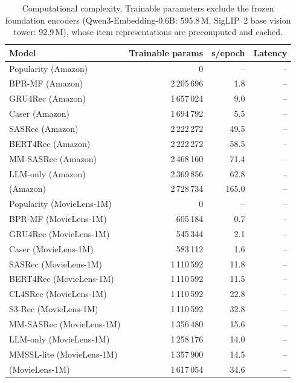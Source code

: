 \begin{table}[t]
\centering
\caption{Computational complexity. Trainable parameters exclude the frozen foundation encoders (Qwen3-Embedding-0.6B: 595.8\,M, SigLIP~2 base vision tower: 92.9\,M), whose item representations are precomputed and cached.}
\label{tab:complexity}
\small
\begin{tabular}{lrrr}
\toprule
Model & Trainable params & s/epoch & Latency \\
\midrule
Popularity (Amazon) & 0 & -- & -- \\
BPR-MF (Amazon) & 2\,205\,696 & 1.8 & -- \\
GRU4Rec (Amazon) & 1\,657\,024 & 9.0 & -- \\
Caser (Amazon) & 1\,694\,792 & 5.5 & -- \\
SASRec (Amazon) & 2\,222\,272 & 49.5 & -- \\
BERT4Rec (Amazon) & 2\,222\,272 & 58.5 & -- \\
MM-SASRec (Amazon) & 2\,468\,160 & 71.4 & -- \\
LLM-only (Amazon) & 2\,369\,856 & 62.8 & -- \\
\model{} (Amazon) & 2\,728\,734 & 165.0 & -- \\
Popularity (MovieLens-1M) & 0 & -- & -- \\
BPR-MF (MovieLens-1M) & 605\,184 & 0.7 & -- \\
GRU4Rec (MovieLens-1M) & 545\,344 & 2.1 & -- \\
Caser (MovieLens-1M) & 583\,112 & 1.6 & -- \\
SASRec (MovieLens-1M) & 1\,110\,592 & 11.8 & -- \\
BERT4Rec (MovieLens-1M) & 1\,110\,592 & 11.5 & -- \\
CL4SRec (MovieLens-1M) & 1\,110\,592 & 22.8 & -- \\
S3-Rec (MovieLens-1M) & 1\,110\,592 & 32.8 & -- \\
MM-SASRec (MovieLens-1M) & 1\,356\,480 & 15.6 & -- \\
LLM-only (MovieLens-1M) & 1\,258\,176 & 14.0 & -- \\
MMSSL-lite (MovieLens-1M) & 1\,357\,900 & 14.5 & -- \\
\model{} (MovieLens-1M) & 1\,617\,054 & 34.6 & -- \\
\bottomrule
\end{tabular}
\end{table}
